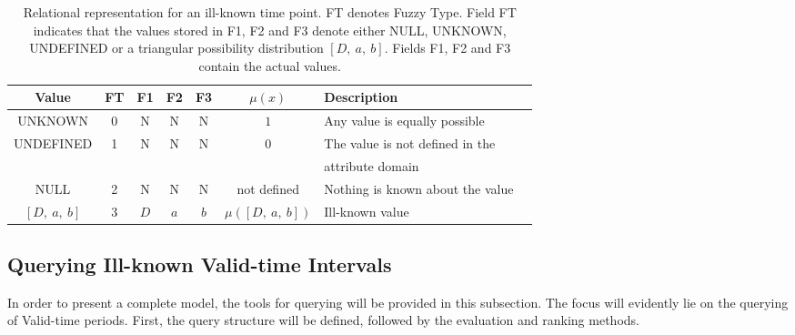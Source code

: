 \vspace{-10pt}

\begin{table}
\centering
\begin{tabular}{c c c c c c l p{2cm}}
\hline
Value & FT & F1 & F2 & F3 & $\mu(x)$ & Description \\ \hline
UNKNOWN & 0 & N & N & N  & $1$ & Any value is equally possible\\ 
UNDEFINED & 1 & N & N & N & $0$ & The value is not defined in the \\
          &   &   &   &   &     & attribute domain\\ 
NULL & 2 & N & N & N &not defined & Nothing is known about the value \\ 
$\left[D,\ a,\ b \right]$ & 3 & $D$ & $a$ & $b$ & $\mu(\left[D,\ a,\ b \right])$ & Ill-known value \\ 
\hline 
\end{tabular}
\label{table:relational-representation-pvp}

\vspace{10pt}

\caption{Relational representation for an ill-known time point. FT denotes Fuzzy Type. Field FT indicates that the values stored in F1, F2 and F3 denote either NULL, UNKNOWN, UNDEFINED or a triangular possibility distribution $\left[D,\ a,\ b \right]$. Fields F1, F2 and F3 contain the actual values.}%
\end{table}

\vspace{-25pt}

\subsection{Querying Ill-known Valid-time Intervals}
In order to present a complete model, the tools for querying will be provided in this subsection. The focus will evidently lie on the querying of Valid-time periods. First, the query structure will be defined, followed by the evaluation and ranking methods.




